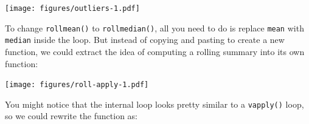 \begin{Shaded}
\begin{Highlighting}[]
\StringTok{ }\NormalTok{(}\NormalTok{, }\NormalTok{, } \NormalTok{) +}\StringTok{ }\NormalTok{(}\NormalTok{, } \NormalTok{) /}\StringTok{ }
\NormalTok{(}\NormalTok{), } \NormalTok{, } \NormalTok{)}
\end{Highlighting}
\end{Shaded}

\texttt{[image: figures/outliers-1.pdf]}

To change \texttt{rollmean()} to \texttt{rollmedian()}, all you need to
do is replace \texttt{mean} with \texttt{median} inside the loop. But
instead of copying and pasting to create a new function, we could
extract the idea of computing a rolling summary into its own function:

\begin{Shaded}
\begin{Highlighting}[]
\StringTok{ }
  \StringTok{ }\NormalTok{(}\NormalTok{, }

  \StringTok{ }\StringTok{ }\NormalTok{)}
  \StringTok{ }\NormalTok{):(}\StringTok{ }\StringTok{ }\StringTok{ }\NormalTok{)) \{}
    \StringTok{ }\NormalTok{(x[(i -}\StringTok{ }\StringTok{ }\NormalTok{offset)], ...)}
  \NormalTok{\}}
\NormalTok{\}}
\NormalTok{(} \NormalTok{, } \NormalTok{)}
\end{Highlighting}
\end{Shaded}

\texttt{[image: figures/roll-apply-1.pdf]}

You might notice that the internal loop looks pretty similar to a
\texttt{vapply()} loop, so we could rewrite the function as:

